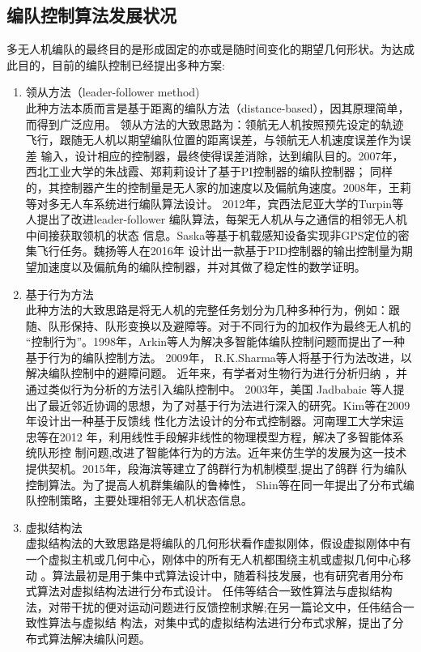 \subsection{编队控制算法发展状况}
多无人机编队的最终目的是形成固定的亦或是随时间变化的期望几何形状。为达成此目的，目前的编队控制已经提出多种方案:
\begin{enumerate}
    \item 领从方法（leader-follower method)\\
        此种方法本质而言是基于距离的编队方法（distance-based），因其原理简单，而得到广泛应用。
        领从方法的大致思路为：领航无人机按照预先设定的轨迹飞行，跟随无人机以期望编队位置的距离误差，与领航无人机速度误差作为误差
        输入，设计相应的控制器，最终使得误差消除，达到编队目的。2007年，西北工业大学的朱战霞、郑莉莉设计了基于PI控制器的编队控制器；
        同样的，其控制器产生的控制量是无人家的加速度以及偏航角速度。\cite{ZhuZhanXia2007}2008年，王莉等对多无人车系统进行编队算法设计。\cite{WangLi2008}
        2012年，宾西法尼亚大学的Turpin等人提出了改进leader-follower 编队算法，每架无人机从与之通信的相邻无人机中间接获取领机的状态
        信息。\cite{Turpin2012Trajectory}Saska等基于机载感知设备实现非GPS定位的密集飞行任务。\cite{Saska2017System}魏扬等人在2016年
        设计出一款基于PID控制器的输出控制量为期望加速度以及偏航角的编队控制器，并对其做了稳定性的数学证明。\cite{WeiYang2016}
    \item 基于行为方法\\
        此种方法的大致思路是将无人机的完整任务划分为几种多种行为，例如：跟随、队形保持、队形变换以及避障等。对于不同行为的加权作为最终无人机的
        “控制行为”。1998年，Arkin等人为解决多智能体编队控制问题而提出了一种基于行为的编队控制方法。\cite{Balch1998Behavior} 2009年，
        R.K.Sharma等人将基于行为法改进，以解决编队控制中的避障问题。\cite{Sharma2009Collision} 近年来，有学者对生物行为进行分析归纳
        ，并通过类似行为分析的方法引入编队控制中。
        2003年，美国 Jadbabaie 等人提出了最近邻近协调的思想，为了对基于行为法进行深入的研究。\cite{Jadbabaie2003Coordination}Kim等在2009年设计出一种基于反馈线
        性化方法设计的分布式控制器。\cite{Kim2009}河南理工大学宋运忠等在2012 年，利用线性手段解非线性的物理模型方程，解决了多智能体系统队形控
        制问题,改进了智能体行为的方法。\cite{SongYunZhong2012}近年来仿生学的发展为这一技术提供契机。2015年，段海滨等建立了鸽群行为机制模型,提出了鸽群
        行为编队控制算法。\cite{DuanHaiBin2015}为了提高人机群集编队的鲁棒性，
        Shin等在同一年提出了分布式编队控制策略，主要处理相邻无人机状态信息。\cite{Jongho2015}
    \item 虚拟结构法\\
        虚拟结构法的大致思路是将编队的几何形状看作虚拟刚体，假设虚拟刚体中有一个虚拟主机或几何中心，刚体中的所有无人机都围绕主机或虚拟几何中心移动\cite{Lewis1997High}
        。算法最初是用于集中式算法设计中，随着科技发展，也有研究者用分布式算法对虚拟结构法进行分布式设计。
        任伟等结合一致性算法与虚拟结构法，对带干扰的便对运动问题进行反馈控制求解\cite{Ren2004Formation};在另一篇论文中，任伟结合一致性算法与虚拟结
        构法，对集中式的虚拟结构法进行分布式求解，提出了分布式算法解决编队问题。\cite{Ren2004Decentralized}
\end{enumerate}
